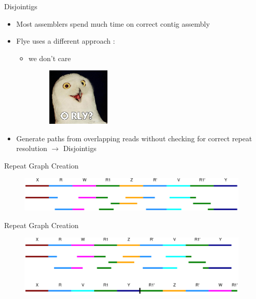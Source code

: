 \documentclass{beamer}
\begin{document}
  \begin{frame}{Disjointigs}
    \begin{itemize}[<+- | alert@+>]
      \item Most assemblers spend much time on correct contig assembly

      \item Flye uses a different approach \cite{kolmogorov_assembly_2019}:
      
      \begin{itemize}[<+- | alert@+>]
        \item we don't care 
        \begin{figure}
          \captionsetup{labelformat=empty}
          \includegraphics[width=3cm]{images/orly-owl.jpg}
          \label{fig:orly}
        \end{figure}
        
      \end{itemize}

      \item Generate paths from overlapping reads without checking for correct repeat resolution $\rightarrow$ Disjointigs
    \end{itemize}
  \end{frame}

  \begin{frame}{Repeat Graph Creation}
    \begin{figure}
      \captionsetup{labelformat=empty}
      \includegraphics[width=11cm]{images/genome_and_reads.png}
      \label{fig:genome_and_reads}
    \end{figure}
  \end{frame}

  \begin{frame}{Repeat Graph Creation}
    \begin{figure}
      \captionsetup{labelformat=empty}
      \includegraphics[width=11cm]{images/disjointigs.png}
      \label{fig:disjointigs}
    \end{figure}
  \end{frame}
\end{document}
